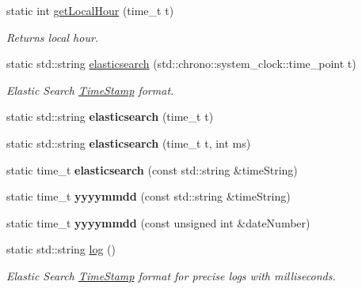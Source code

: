 \begin{DoxyCompactItemize}
static int \hyperlink{classTimeStamp_aabcdf6d992a680d9da815f0a78683e59}{get\+Local\+Hour} (time\+\_\+t t)
\begin{DoxyCompactList}\small\item\em Returns local hour. \end{DoxyCompactList}\item 
\mbox{\label{classTimeStamp_a456d0271b13636d11d6871bafe4c7f62}} 
static std\+::string \hyperlink{classTimeStamp_a456d0271b13636d11d6871bafe4c7f62}{elasticsearch} (std\+::chrono\+::system\+\_\+clock\+::time\+\_\+point t)
\begin{DoxyCompactList}\small\item\em Elastic Search \hyperlink{classTimeStamp}{Time\+Stamp} format. \end{DoxyCompactList}\item 
\mbox{\label{classTimeStamp_a0e829646c9d7366ba987f977a42ab191}} 
static std\+::string {\bfseries elasticsearch} (time\+\_\+t t)
\item 
\mbox{\label{classTimeStamp_abe1a70441d20385f4ca4ddec07ef9342}} 
static std\+::string {\bfseries elasticsearch} (time\+\_\+t t, int ms)
\item 
\mbox{\label{classTimeStamp_a8e8f74521e03cabed287f5ffffd4d518}} 
static time\+\_\+t {\bfseries elasticsearch} (const std\+::string \&time\+String)
\item 
\mbox{\label{classTimeStamp_ae61c2b60ddae2ef62051af03b6ca387e}} 
static time\+\_\+t {\bfseries yyyymmdd} (const std\+::string \&time\+String)
\item 
\mbox{\label{classTimeStamp_a14f4c3194f3e3caec6082eb00a6f0263}} 
static time\+\_\+t {\bfseries yyyymmdd} (const unsigned int \&date\+Number)
\item 
\mbox{\label{classTimeStamp_ac18cb68d8341ea6d2c551b1ad5781394}} 
static std\+::string \hyperlink{classTimeStamp_ac18cb68d8341ea6d2c551b1ad5781394}{log} ()
\begin{DoxyCompactList}\small\item\em Elastic Search \hyperlink{classTimeStamp}{Time\+Stamp} format for precise logs with milliseconds. \end{DoxyCompactList}\item 

\end{DoxyCompactItemize}
